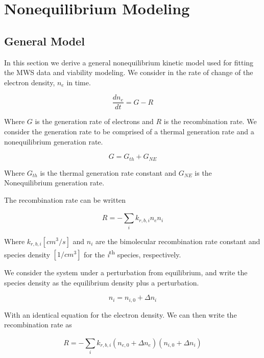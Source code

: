 \section{Nonequilibrium Modeling}

\subsection{General Model}

In this section we derive a general nonequilibrium kinetic model used for fitting the MWS data and viability modeling. We consider in the rate of change of the electron density, \(n_{e}\) in time. 

\begin{equation}
  \label{eq:start_deqn}
\frac{dn_{e}}{dt} = G - R
\end{equation}

Where \(G\) is the generation rate of electrons and \(R\) is the recombination rate. We consider the generation rate to be comprised of a thermal generation rate and a nonequilibrium generation rate.

\begin{equation}
  G = G_{th} + G_{NE}
\end{equation}

Where \(G_{th}\) is the thermal generation rate constant and \(G_{NE}\) is the Nonequilibrium generation rate. 

The recombination rate can be written

\begin{equation}
  R = - \sum_{i}^{}k_{r, b, i}n_{e}n_{i}
\end{equation}

Where $k_{r, b, i} [cm^3/s]$  and $n_i$ are the bimolecular recombination rate constant and species density $[1/cm^3]$ for the \emph{i}\textsuperscript{th} species, respectively. 

We consider the system under a perturbation from equilibrium, and write the species density as the equilibrium density plus a perturbation.

\begin{equation}
  n_{i} = n_{i,0} + \Delta n_{i}
\end{equation}

With an identical equation for the electron density. We can then write the recombination rate as

\begin{equation}
  R = - \sum_{i}^{}k_{r, b, i}(n_{e,0} + \Delta n_{e})(n_{i,0} + \Delta n_{i})
\end{equation}

